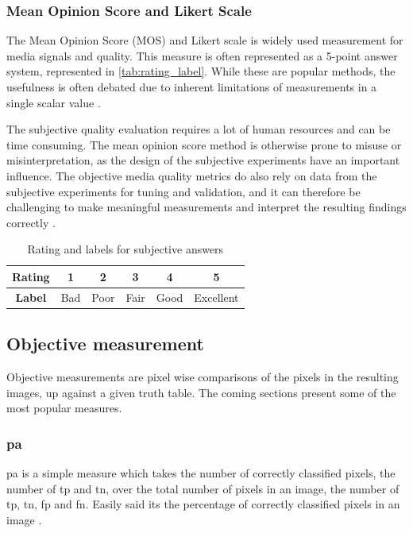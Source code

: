 \subsubsection{Mean Opinion Score and Likert Scale}
\label{sec:mos}
The Mean Opinion Score (MOS) \cite{Streijl2016} and Likert scale \cite{likert_scale} is widely used measurement for media signals and quality. This  measure is often represented as a 5-point answer system, represented in \autoref{tab:rating_label}. While these are popular methods, the usefulness is often debated due to inherent limitations of measurements in a single scalar value \cite{wiki_mos}. 

The subjective quality evaluation requires a lot of human resources and can be time consuming. The mean opinion score method is otherwise prone to misuse or misinterpretation, as the design of the subjective experiments have an important influence. The objective media quality metrics do also rely on data from the subjective experiments for tuning and validation, and it can therefore be challenging to make meaningful measurements and interpret the resulting findings correctly \cite{Streijl2016}.


\begin{table}[]
    \centering
    \begin{tabular}{ |c|c|c|c|c|c| } 
         \hline
         \textbf{Rating} & 1 & 2 & 3 & 4 & 5 \\
         \hline
         \textbf{Label} & Bad & Poor & Fair & Good & Excellent \\ 
         \hline
    \end{tabular}
    \caption{Rating and labels for subjective answers}
    \label{tab:rating_label}
\end{table}

\subsection{Objective measurement}\label{sec:objective_measurement}
Objective measurements are pixel wise comparisons of the pixels in the resulting images, up against a given truth table. The coming sections present some of the most popular measures. 

\subsubsection{\acrlong{pa}}
\acrfull{pa} is a simple measure which takes the number of correctly classified pixels, the number of \acrlong{tp} and \acrlong{tn}, over the total number of pixels in an image, the number of \acrlong{tp}, \acrlong{tn}, \acrshort{fp} and \acrshort{fn}. Easily said its the percentage of correctly classified pixels in an image \cite{jeremy}.


